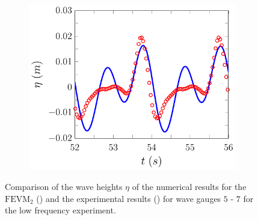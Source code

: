 \begin{figure}
	\begin{subfigure}{0.5\textwidth}
		\includegraphics[width=\textwidth]{./chp6/figures/Experiment/Beji/sl/FEVMWG7.pdf}
		\vspace{0.5cm}
	\end{subfigure}
	\caption{Comparison of the wave heights $\eta$ of the numerical results for the $\text{FEVM}_2$ ({\color{blue}\solidrule}) and the experimental results () for wave gauges $5$ - $7$ for the low frequency experiment.}
	\label{fig:BejislWG5to7FEVM}
\end{figure}



